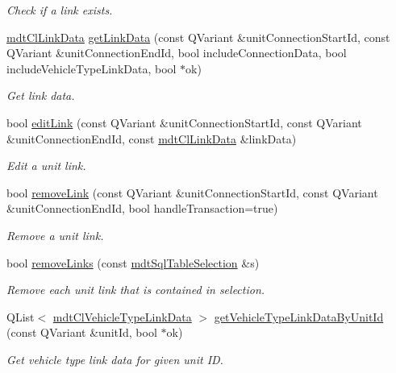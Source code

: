 \begin{DoxyCompactItemize}
\begin{DoxyCompactList}\small\item\em Check if a link exists. \end{DoxyCompactList}\item 
\hyperlink{classmdt_cl_link_data}{mdt\-Cl\-Link\-Data} \hyperlink{classmdt_cl_link_ab84d16e3db0b15784594505e9996c0dc}{get\-Link\-Data} (const Q\-Variant \&unit\-Connection\-Start\-Id, const Q\-Variant \&unit\-Connection\-End\-Id, bool include\-Connection\-Data, bool include\-Vehicle\-Type\-Link\-Data, bool $\ast$ok)
\begin{DoxyCompactList}\small\item\em Get link data. \end{DoxyCompactList}\item 
bool \hyperlink{classmdt_cl_link_a20d0c8888a1674a6977940fcde654f60}{edit\-Link} (const Q\-Variant \&unit\-Connection\-Start\-Id, const Q\-Variant \&unit\-Connection\-End\-Id, const \hyperlink{classmdt_cl_link_data}{mdt\-Cl\-Link\-Data} \&link\-Data)
\begin{DoxyCompactList}\small\item\em Edit a unit link. \end{DoxyCompactList}\item 
bool \hyperlink{classmdt_cl_link_a865c0cee1fab1c9209d139dcd70f9fbd}{remove\-Link} (const Q\-Variant \&unit\-Connection\-Start\-Id, const Q\-Variant \&unit\-Connection\-End\-Id, bool handle\-Transaction=true)
\begin{DoxyCompactList}\small\item\em Remove a unit link. \end{DoxyCompactList}\item 
bool \hyperlink{classmdt_cl_link_a91b55ddf0dd2129b4b0bf499b2916102}{remove\-Links} (const \hyperlink{classmdt_sql_table_selection}{mdt\-Sql\-Table\-Selection} \&s)
\begin{DoxyCompactList}\small\item\em Remove each unit link that is contained in selection. \end{DoxyCompactList}\item 
Q\-List$<$ \hyperlink{classmdt_cl_vehicle_type_link_data}{mdt\-Cl\-Vehicle\-Type\-Link\-Data} $>$ \hyperlink{classmdt_cl_link_ad7c30c7cfae5f38fc38133f550e2dd01}{get\-Vehicle\-Type\-Link\-Data\-By\-Unit\-Id} (const Q\-Variant \&unit\-Id, bool $\ast$ok)
\begin{DoxyCompactList}\small\item\em Get vehicle type link data for given unit I\-D. \end{DoxyCompactList}\item 

\end{DoxyCompactItemize}
